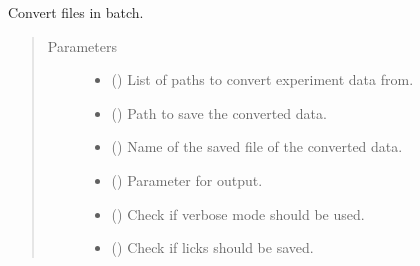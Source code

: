 \documentclass[letterpaper,10pt,english]{sphinxmanual}
\begin{document}
\begin{fulllineitems}
\label{\detokenize{NoSeMazeController/Analysis:Analysis.Conversion.batch_convert}}
\pysigstartsignatures
{}
\pysigstopsignatures
\sphinxAtStartPar
Convert files in batch.
\begin{quote}\begin{description}
\item[{Parameters}] \leavevmode\begin{itemize}
\item {} 
\sphinxAtStartPar
{} () \textendash{} List of paths to convert experiment data from.

\item {} 
\sphinxAtStartPar
{} () \textendash{} Path to save the converted data.

\item {} 
\sphinxAtStartPar
{} () \textendash{} Name of the saved file of the converted data.

\item {} 
\sphinxAtStartPar
{} () \textendash{} Parameter for output.

\item {} 
\sphinxAtStartPar
{} () \textendash{} Check if verbose mode should be used.

\item {} 
\sphinxAtStartPar
{} () \textendash{} Check if licks should be saved.

\end{itemize}

\end{description}\end{quote}

\end{fulllineitems}
\end{document}
